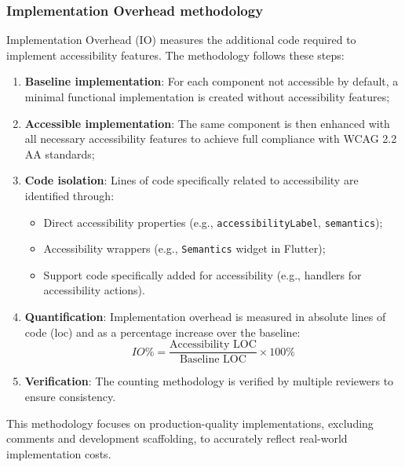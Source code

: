 \subsubsection{Implementation Overhead methodology}
\label{subsubsec:io-methodology}

Implementation Overhead (IO) measures the additional code required to implement accessibility features. The methodology follows these steps:

\begin{enumerate}
    \item \textbf{Baseline implementation}: For each component not accessible by default, a minimal functional implementation is created without accessibility features;
    
    \item \textbf{Accessible implementation}: The same component is then enhanced with all necessary accessibility features to achieve full compliance with WCAG 2.2 AA standards;
    
    \item \textbf{Code isolation}: Lines of code specifically related to accessibility are identified through:
    \begin{itemize}
        \item Direct accessibility properties (e.g., \texttt{accessibilityLabel}, \texttt{semantics});
        \item Accessibility wrappers (e.g., \texttt{Semantics} widget in Flutter);
        \item Support code specifically added for accessibility (e.g., handlers for accessibility actions).
    \end{itemize}
    
    \item \textbf{Quantification}: Implementation overhead is measured in absolute lines of code (\acrshort{loc}) and as a percentage increase over the baseline:
    \begin{equation}
    IO\% = \frac{\text{Accessibility LOC}}{\text{Baseline LOC}} \times 100\%
    \end{equation}
    
    \item \textbf{Verification}: The counting methodology is verified by multiple reviewers to ensure consistency.
\end{enumerate}

This methodology focuses on production-quality implementations, excluding comments and development scaffolding, to accurately reflect real-world implementation costs.

